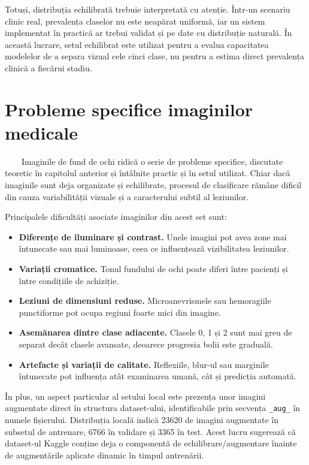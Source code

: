\documentclass[12pt, a4paper, oneside, romanian]{teza-upb}
\begin{document}
Totuși, distribuția echilibrată trebuie interpretată cu atenție. Într-un scenariu clinic real, prevalența claselor nu este neapărat uniformă, iar un sistem implementat în practică ar trebui validat și pe date cu distribuție naturală. În această lucrare, setul echilibrat este utilizat pentru a evalua capacitatea modelelor de a separa vizual cele cinci clase, nu pentru a estima direct prevalența clinică a fiecărui stadiu.

\section{Probleme specifice imaginilor medicale}

\ \ \ \ Imaginile de fund de ochi ridică o serie de probleme specifice, discutate teoretic în capitolul anterior și întâlnite practic și în setul utilizat. Chiar dacă imaginile sunt deja organizate și echilibrate, procesul de clasificare rămâne dificil din cauza variabilității vizuale și a caracterului subtil al leziunilor.
\bigskip

Principalele dificultăți asociate imaginilor din acest set sunt:

\begin{itemize}
  \item \textbf{Diferențe de iluminare și contrast.} Unele imagini pot avea zone mai întunecate sau mai luminoase, ceea ce influențează vizibilitatea leziunilor.
  \item \textbf{Variații cromatice.} Tonul fundului de ochi poate diferi între pacienți și între condițiile de achiziție.
  \item \textbf{Leziuni de dimensiuni reduse.} Microanevrismele sau hemoragiile punctiforme pot ocupa regiuni foarte mici din imagine.
  \item \textbf{Asemănarea dintre clase adiacente.} Clasele 0, 1 și 2 sunt mai greu de separat decât clasele avansate, deoarece progresia bolii este graduală.
  \item \textbf{Artefacte și variații de calitate.} Reflexiile, blur-ul sau marginile întunecate pot influența atât examinarea umană, cât și predicția automată.
\end{itemize}

În plus, un aspect particular al setului local este prezența unor imagini augmentate direct în structura dataset-ului, identificabile prin secvența \texttt{\_aug\_} în numele fișierului. Distribuția locală indică 23620 de imagini augmentate în subsetul de antrenare, 6766 în validare și 3365 în test. Acest lucru sugerează că dataset-ul Kaggle conține deja o componentă de echilibrare/augmentare înainte de augmentările aplicate dinamic în timpul antrenării.
\bigskip
\end{document}
